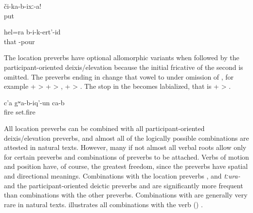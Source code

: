 \begin{exe}
	\ex	\label{ex:Put (it) down verbs}
	\gll	či-ka-b-ixː-a!\\
		put\\
	\glt	{}

	\ex	\label{ex:I pour this in as well verbs}
	\gll	hel=ra	b-i-k-ert'-id\\
		that	-pour\\
	\glt	{}
\end{exe}

The location preverbs have optional allomorphic variants when followed by the par\-tic\-i\-pant-oriented deixis\slash elevation   because the initial fricative of the second  is omitted. The preverbs ending in  change that vowel to  under omission of , for example  +  >  +  > ,  +  > . The stop in the   becomes labialized, that is  +  >  .\largerpage

\begin{exe}
	\ex	\label{ex:(Somebody) set up verbs}
	\gll	c'a	gʷa-b-iq'-un	ca-b\\
		fire	set.fire	\\
	\glt	{}
\end{exe}

All location preverbs can be combined with all participant-oriented deixis/elevation preverbs, and almost all of the logically possible combinations are attested in natural texts. However, many if not almost all verbal roots allow only for certain preverbs and combinations of preverbs to be attached. Verbs of motion and position have, of course, the greatest freedom, since the preverbs have spatial and directional meanings. Combinations with the location preverbs , and \textit{tːura-} and the participant-oriented deictic preverbs  and  are significantly more frequent than combinations with the other preverbs. Combinations with  are generally very rare in natural texts.  illustrates all combinations with the verb  () .

